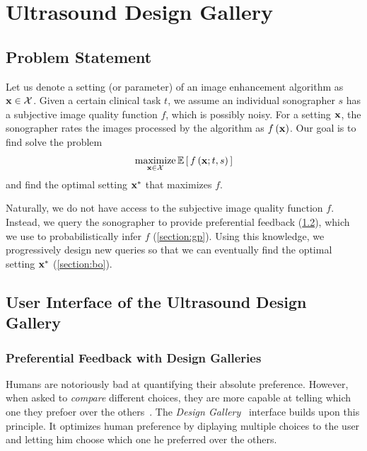 
\section{Ultrasound Design Gallery}\label{section:usdg}


\subsection{Problem Statement}
Let us denote a setting (or parameter) of an image enhancement algorithm as \(\mathbf{x} \in \mathcal{X}\).
Given a certain clinical task \(t\), we assume an individual sonographer \(s\) has a subjective image quality function \(f\), which is possibly noisy.
For a setting \(\mathbf{x}\), the sonographer rates the images processed by the algorithm as \(f\left(\mathbf{x}\right)\).
Our goal is to find solve the problem
%
\begin{align}
  \operatorname*{maximize}_{\mathbf{x} \in \mathcal{X}} \mathbb{E}\left[\,f\left(\mathbf{x}; t, s \right)\,\right]
\end{align}
%
and find the optimal setting \(\mathbf{x}^*\) that maximizes \(f\).

Naturally, we do not have access to the subjective image quality function \(f\).
Instead, we query the sonographer to provide preferential feedback (\cref{section:ui}), which we use to probabilistically infer \(f\) (\cref{section:gp}).
Using this knowledge, we progressively design new queries so that we can eventually find the optimal setting \(\mathbf{x}^*\) (\cref{section:bo}).

\subsection{User Interface of the Ultrasound Design Gallery}\label{section:ui}
\subsubsection{Preferential Feedback with Design Galleries}
Humans are notoriously bad at quantifying their absolute preference.
However, when asked to \textit{compare} different choices, they are more capable at telling which one they prefoer over the others~\cite{10.2307/27821441, NIPS2007_b6a1085a}.
The \textit{Design Gallery}~\cite{10.1145/258734.258887} interface builds upon this principle.
It optimizes human preference by diplaying multiple choices to the user and letting him choose which one he preferred over the others.

